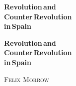 \begin{titlepage}
	\setlength{\parindent}{0pt}
	
	\vspace*{\fill}
	
	{\bfseries\sffamily\fontsize{42}{42}\selectfont
		Revolution\,\textnormal{and} \\
		Counter\,Revolution \\
		\textnormal{in}\,Spain
		\par}
	
	\vspace{32pt}
	
	\vspace*{\fill}
	
\end{titlepage}

\begin{titlepage}
	\setlength{\parindent}{0pt}
	
	\vspace*{\fill}
	
	{\bfseries\sffamily\fontsize{42}{42}\selectfont
		Revolution\,\textnormal{and} \\
		Counter\,Revolution \\
		\textnormal{in}\,Spain
		\par}
	
	\vspace{11pt}
	
	{\normalfont\fontsize{21}{21}\selectfont
		\textsc{Felix Morrow}
		\par}
	
	\vspace*{\fill}
	
\end{titlepage}

